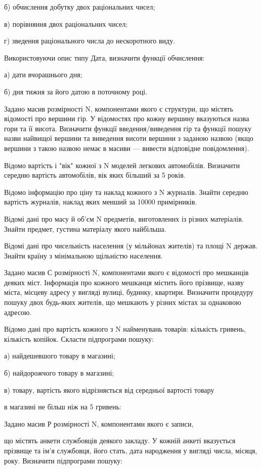 \documentclass[]{article}
\begin{document}
б) обчислення добутку двох раціональних чисел;

в) порівняння двох раціональних чисел;

г) зведення раціонального числа до нескоротного виду.

Використовуючи опис типу Дата, визначити функції обчислення:

а) дати вчорашнього дня;

б) дня тижня за його датою в поточному році.

Задано масив розмірності N, компонентами якого є структури, що містять
відомості про вершини гір. У відомостях про кожну вершину вказуються
назва гори та її висота. Визначити функції введення/виведення гір та
функції пошуку назви найвищої вершини та виведення висоти вершини з
заданою назвою (якщо вершини з такою назвою немає в масиви --- вивести
відповідне повідомлення).

Відомо вартість і "вік" кожної з N моделей легкових автомобілів.
Визначити середню вартість автомобілів, вік яких більший за 5 років.

Відомо інформацію про ціну та наклад кожного з N журналів. Знайти
середню вартість журналів, наклад яких менший за 10000 примірників.

Відомі дані про масу й об'єм N предметів, виготовлених із різних
матеріалів. Знайти предмет, густина матеріалу якого найбільша.

Відомі дані про чисельність населення (у мільйонах жителів) та площі N
держав. Знайти країну з мінімальною щільністю населення.

Задано масив С розмірності N, компонентами якого є відомості про
мешканців деяких міст. Інформація про кожного мешканця містить його
прізвище, назву міста, місцеву адресу у вигляді вулиці, будинку,
квартири. Визначити процедуру пошуку двох будь-яких жителів, що мешкають
у різних містах за однаковою адресою.

Відомо дані про вартість кожного з N найменувань товарів: кількість
гривень, кількість копійок. Скласти підпрограми пошуку:

а) найдешевшого товару в магазині;

б) найдорожчого товару в магазині;

в) товару, вартість якого відрізняється від середньої вартості товару

в магазині не більш ніж на 5 гривень:

Задано масив Р розмірності N, компонентами якого є записи,

що містять анкети службовців деякого закладу. У кожній анкеті вказується
прізвище та ім'я службовця, його стать, дата народження у вигляді числа,
місяця, року. Визначити підпрограми пошуку:
\end{document}
